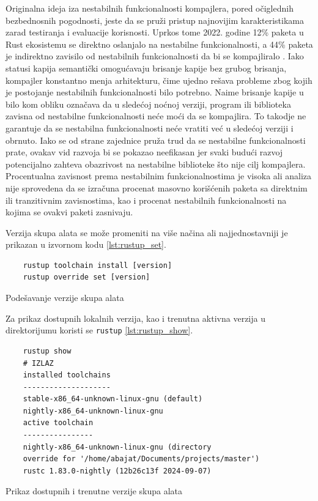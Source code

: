 \documentclass[11pt]{article}
\begin{document}
Originalna ideja iza nestabilnih funkcionalnosti kompajlera, pored očiglednih bezbednosnih pogodnosti, 
jeste da se pruži pristup najnovijim karakteristikama zarad testiranja i evaluacije korisnosti.
Uprkos tome 2022. godine 12\%  paketa u Rust ekosistemu se direktno oslanjalo na nestabilne funkcionalnosti, a 
44\% paketa je indirektno zavisilo od nestabilnih funkcionalnosti da bi se kompajliralo \cite{unstable-flags}. Iako 
statusi kapija semantički omogućavaju brisanje kapije bez grubog brisanja, kompajler konstantno menja arhitekturu, čime ujedno 
rešava probleme zbog kojih je postojanje nestabilnih funkcionalnosti bilo potrebno. Naime brisanje kapije 
u bilo kom obliku označava da u sledećoj noćnoj verziji, program ili biblioteka zavisna od nestabilne funkcionalnosti
neće moći da se kompajlira. To takodje ne garantuje da se nestabilna funkcionalnosti neće vratiti već u sledećoj
verziji i obrnuto. Iako se od strane zajednice pruža trud da se nestabilne funkcionalnosti prate, ovakav vid 
razvoja bi se pokazao neefikasan jer svaki budući razvoj potencijalno zahteva obazrivost na nestabilne 
biblioteke što nije cilj kompajlera. Procentualna zavisnost prema nestabilnim funkcionalnostima je visoka ali 
analiza nije sprovedena da se izračuna procenat masovno korišćenih paketa sa direktnim ili tranzitivnim
zavisnostima, kao i procenat nestabilnih funkcionalnosti na kojima se ovakvi paketi zasnivaju.

Verzija skupa alata se može promeniti na više načina ali najjednostavniji je prikazan u izvornom kodu \ref{lst:rustup_set}.

\begin{listing}[H]
\begin{verbatim}
    rustup toolchain install [version]
    rustup override set [version]
\end{verbatim}
\caption{Podešavanje verzije skupa alata}
\label{lst:rustup_set}
\end{listing}

Za prikaz dostupnih lokalnih verzija, kao i trenutna aktivna verzija u direktorijumu koristi se \verb|rustup| \ref{lst:rustup_show}.

\begin{listing}[H]
\begin{verbatim}
    rustup show
    # IZLAZ
    installed toolchains
    --------------------
    stable-x86_64-unknown-linux-gnu (default)
    nightly-x86_64-unknown-linux-gnu
    active toolchain
    ----------------
    nightly-x86_64-unknown-linux-gnu (directory 
    override for '/home/abajat/Documents/projects/master')
    rustc 1.83.0-nightly (12b26c13f 2024-09-07)
\end{verbatim}
\caption{Prikaz dostupnih i trenutne verzije skupa alata}
\label{lst:rustup_show}
\end{listing}
\end{document}
